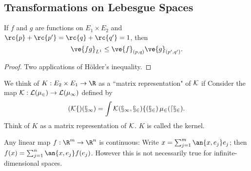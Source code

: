 
\subsection{Transformations on Lebesgue Spaces}
\begin{pr}
If $f$ and $g$ are functions on $E_1\times E_2$ and $\rc{p}+\rc{p'}=\rc{q}+\rc{q'}=1$, then
\[
\ve{fg}_{L^1}\le \ve{f}_{(p,q)}\ve{g}_{(p',q')}.
\]
\end{pr}
\begin{proof}
Two applications of H\"older's inequality.
\end{proof}
We think of $K:E_2\times E_1\to \R$ as a ``matrix representation" of $\cal K$ if
Consider the map $\cal K:L(\mu_2)\to L(\mu_1)$ defined by 
\[(\cal Kf)(x_1)=\int K(x_1,x_2)f(x_2)\,\mu_2(dx_2).\]
Think of $K$ as a matrix representation of $\cal K$. $K$ is called the kernel. 

Any linear map $f:\R^m\to \R^n$ is continuous: Write $x=\sum_{j=1}^m \an{x,e_j}e_j$; then $f(x)=\sum_{j=1}^n \an{x,e_j}f(e_j)$. However this is not necessarily true for infinite-dimensional spaces.

